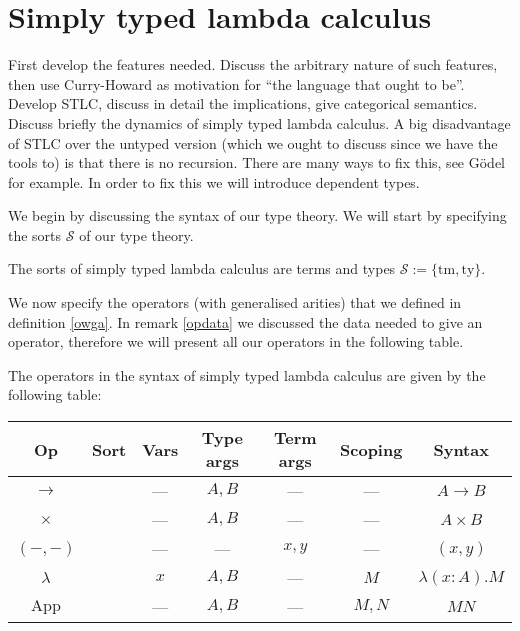 \newcommand{\tm}{\mathrm{tm}}
\newcommand{\ty}{\mathrm{ty}}
\newcommand{\fst}{\mathrm{fst}}
\newcommand{\snd}{\mathrm{snd}}

%
%
\section{Simply typed lambda calculus} 


First develop the features needed. Discuss the arbitrary nature of such features, then use Curry-Howard as motivation for ``the language that ought to be''. Develop STLC, discuss in detail the implications, give categorical semantics. Discuss briefly the dynamics of simply typed lambda calculus. A big disadvantage of STLC over the untyped version (which we ought to discuss since we have the tools to) is that there is no recursion. There are many ways to fix this, see G\"odel for example. In order to fix this we will introduce dependent types.

We begin by discussing the syntax of our type theory. We will start by specifying the sorts $\mathcal{S}$ of our type theory.

\begin{defin}
    The sorts of simply typed lambda calculus are terms and types $\mathcal{S} := \{ \tm , \ty\}$.
\end{defin}

We now specify the operators (with generalised arities) that we defined in definition \ref{owga}. In remark \ref{opdata} we discussed the data needed to give an operator, therefore we will present all our operators in the following table.

\begin{defin}
    The operators in the syntax of simply typed lambda calculus are given by the following table:
    \begin{center}
        \begin{tabular}{ c|c|c|c|c|c|c }
        Op & Sort & Vars & Type args & Term args & Scoping & Syntax \\
        \hline
        $\to$           & \ty &  --- & $A,B$ &  ---  &  ---  & $A \to B$            \\
        $\times$        & \ty &  --- & $A,B$ &  ---  &  ---  & $A \times B$         \\
        $(-,-)$         & \tm &  --- &  ---  & $x,y$ &  ---  & $(x,y)$              \\
        $\lambda$       & \tm &  $x$ & $A,B$ &  ---  &  $M$  & $\lambda (x : A).M$  \\
        $\mathrm{App}$  & \tm &  --- & $A,B$ &  ---  & $M,N$ & $M N$
        \end{tabular}
    \end{center}
\end{defin}

